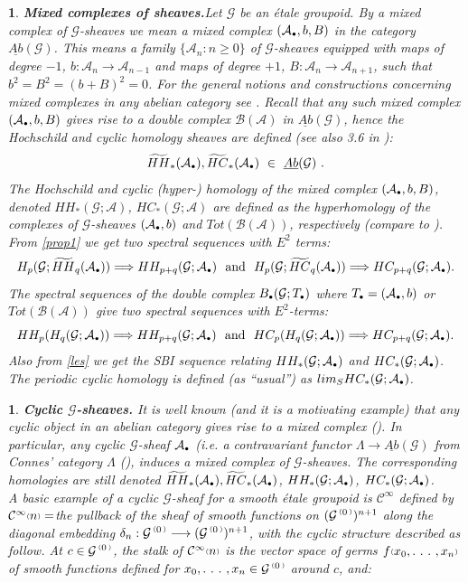 \documentclass[a4paper]{article}
\newtheorem{num}[st]{}
\newcommand{\rmap}{\longrightarrow}
\newcommand{\G}{\ensuremath{\mathcal{G}}}
\newcommand{\A}{\ensuremath{\mathcal{A}}}
\newcommand{\B}{\ensuremath{\mathcal{B}}}
\newcommand{\C}{\ensuremath{\mathcal{C}}}
\newcommand{\abG}{\ensuremath{\underline{Ab}(\G)}}
\newcommand{\cii}{\ensuremath{\C^{\infty}}}
\newcommand{\ps}{{\raise 1pt\hbox{\tiny (}}}
\newcommand{\pd}{{\raise 1pt\hbox{\tiny )}}}
\newcommand{\nG}[1]{\ensuremath{\G^{\,\ps #1\,\pd}}}
\def\cdot{{\raise 0.5pt\hbox{$\scriptscriptstyle\bullet$}}}
\begin{document}
\begin{num}
{\bf Mixed complexes of sheaves.}\emph{Let $\G$ be an \'etale groupoid. By a mixed complex of $\G$-sheaves we mean a mixed complex $(\A_{\cdot}, b, B)$ in the category $\abG$. This means a family $\{ \A_{n}: n\geq 0\} $ of $\G$-sheaves equipped with maps of degree $-1$, $b: \A_{n} \rmap \A_{n-1}$ and maps of degree $+1$, $B: \A_{n} \rmap \A_{n+1}$, such that $b^2= B^2= (b+ B)^2= 0$. For the general notions and constructions concerning mixed complexes in any abelian category see \cite{Kassel}. Recall that any such mixed complex $(\A_{\cdot}, b, B)$ gives rise to a double complex $\B(\A)$ in $\abG$, hence the Hochschild and cyclic homology sheaves are defined (see also 3.6 in \cite{Cra}):}
\[  \widetilde{HH}_{*}(\A_{\cdot}), \widetilde{HC}_{*}(\A_{\cdot}) \ \in \ \abG \ . \]
\emph{The Hochschild and cyclic (hyper-) homology of the mixed complex $(\A_{\cdot}, b, B)$, denoted $HH_{*}(\G; \A)$, $HC_{*}(\G; \A)$ are defined as the hyperhomology of the complexes of $\G$-sheaves $(\A_{\cdot}, b)$ and $Tot(\B(\A))$, respectively (compare to \cite{Kar1, Kar2}). From \ref{prop1} we get two spectral sequences with $E^2$ terms:}
\[ H_{p}(\G;\widetilde{HH}_{q}(\A_{\cdot})) \Longrightarrow HH_{p+q}(\G;\A_{\cdot})\ \ {\rm and}\ \ H_{p}(\G;\widetilde{HC}_{q}(\A_{\cdot})) \Longrightarrow HC_{p+q}(\G;\A_{\cdot}). \]
\emph{The spectral sequences of the double complex $B_{\cdot}(\G;T_{\cdot})$  where $T_{\cdot}=(\A_{\cdot},b)$  or $Tot(\B(\A))$ give two spectral sequences with $E^{2}$-terms:}
\[ HH_{p}(H_{q}(\G;\A_{\cdot})) \Longrightarrow HH_{p+q}(\G;\A_{\cdot})  \ \  \mbox{and} \ \ HC_{p}(H_{q}(\G;\A_{\cdot})) \Longrightarrow HC_{p+q}(\G;\A_{\cdot}) .\]
\emph{Also from \ref{les} we get the SBI sequence relating $HH_{*}(\G; \A_{\cdot})$ and $HC_{*}(\G; \A_{\cdot})$. The periodic cyclic homology is defined (as ``usual'') as $lim_{S} HC_{*}(\G; \A_{\cdot})$.}
\end{num}

\begin{num}
\label{cii}
\emph{
{\bf Cyclic $\G$-sheaves.} It is well known (and it is a motivating example) that any cyclic object in an abelian category gives rise to a mixed complex (\cite{Kassel}). In particular, any cyclic $\G$-sheaf $\A_{\cdot}$ (i.e. a contravariant functor $\Lambda \rmap \abG$ from Connes' category $\Lambda$ (\cite{Co1}), induces a mixed complex of $\G$-sheaves. The corresponding homologies are still denoted $\widetilde{HH}_{*}(\A_{\cdot}), \widetilde{HC}_{*}(\A_{\cdot})$, $HH_{*}(\G; \A_{\cdot})$, $HC_{*}(\G; \A_{\cdot})$. \\
\hspace*{.3in} A basic example of a cyclic $\G$-sheaf for a smooth \'etale groupoid is $\cii$ defined by $\cii \ps n\pd =$the pullback of the sheaf of smooth functions on $(\nG{0})^{n+ 1}$ along the diagonal embedding $\delta_{n}: \nG{0} \rmap (\nG{0})^{n+ 1}$, with the cyclic structure described as follow. At $c \in \nG{0}$, the stalk of $\cii \ps n\pd$ is the vector space of germs $f\ps x_0, .\ .\ .\ , x_n \pd$ of smooth functions defined for $x_0, .\ .\ .\ , x_n \in \nG{0}$ around $c$, and:
}
\end{num}
\end{document}
